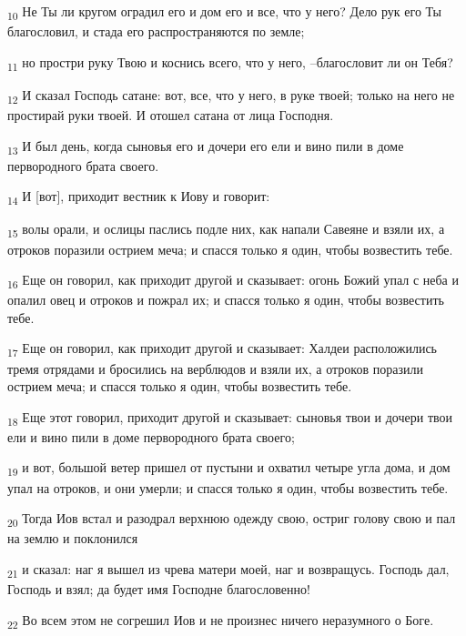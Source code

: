 \begin{tcolorbox}
\textsubscript{10} Не Ты ли кругом оградил его и дом его и все, что у него? Дело рук его Ты благословил, и стада его распространяются по земле;
\end{tcolorbox}
\begin{tcolorbox}
\textsubscript{11} но простри руку Твою и коснись всего, что у него, --благословит ли он Тебя?
\end{tcolorbox}
\begin{tcolorbox}
\textsubscript{12} И сказал Господь сатане: вот, все, что у него, в руке твоей; только на него не простирай руки твоей. И отошел сатана от лица Господня.
\end{tcolorbox}
\begin{tcolorbox}
\textsubscript{13} И был день, когда сыновья его и дочери его ели и вино пили в доме первородного брата своего.
\end{tcolorbox}
\begin{tcolorbox}
\textsubscript{14} И [вот], приходит вестник к Иову и говорит:
\end{tcolorbox}
\begin{tcolorbox}
\textsubscript{15} волы орали, и ослицы паслись подле них, как напали Савеяне и взяли их, а отроков поразили острием меча; и спасся только я один, чтобы возвестить тебе.
\end{tcolorbox}
\begin{tcolorbox}
\textsubscript{16} Еще он говорил, как приходит другой и сказывает: огонь Божий упал с неба и опалил овец и отроков и пожрал их; и спасся только я один, чтобы возвестить тебе.
\end{tcolorbox}
\begin{tcolorbox}
\textsubscript{17} Еще он говорил, как приходит другой и сказывает: Халдеи расположились тремя отрядами и бросились на верблюдов и взяли их, а отроков поразили острием меча; и спасся только я один, чтобы возвестить тебе.
\end{tcolorbox}
\begin{tcolorbox}
\textsubscript{18} Еще этот говорил, приходит другой и сказывает: сыновья твои и дочери твои ели и вино пили в доме первородного брата своего;
\end{tcolorbox}
\begin{tcolorbox}
\textsubscript{19} и вот, большой ветер пришел от пустыни и охватил четыре угла дома, и дом упал на отроков, и они умерли; и спасся только я один, чтобы возвестить тебе.
\end{tcolorbox}
\begin{tcolorbox}
\textsubscript{20} Тогда Иов встал и разодрал верхнюю одежду свою, остриг голову свою и пал на землю и поклонился
\end{tcolorbox}
\begin{tcolorbox}
\textsubscript{21} и сказал: наг я вышел из чрева матери моей, наг и возвращусь. Господь дал, Господь и взял; да будет имя Господне благословенно!
\end{tcolorbox}
\begin{tcolorbox}
\textsubscript{22} Во всем этом не согрешил Иов и не произнес ничего неразумного о Боге.
\end{tcolorbox}
